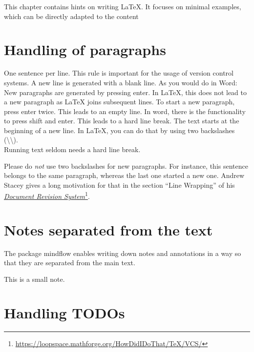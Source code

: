 This chapter contains hints on writing LaTeX.
It focuses on minimal examples, which can be directly adapted to the content

\section{Handling of paragraphs}

\begin{ltgexample}
One sentence per line.
This rule is important for the usage of version control systems.
A new line is generated with a blank line.
As you would do in Word:
New paragraphs are generated by pressing enter.
In LaTeX, this does not lead to a new paragraph as LaTeX joins subsequent lines.
To start a new paragraph, press enter twice.
This leads to an empty line.
In word, there is the functionality to press shift and enter.
This leads to a hard line break.
The text starts at the beginning of a new line.
In LaTeX, you can do that by using two backslashes (\textbackslash\textbackslash).
\\
Running text seldom needs a hard line break.

Please do \textit{not} use two backslashes for new paragraphs.
For instance, this sentence belongs to the same paragraph, whereas the last one started a new one.
Andrew Stacey gives a long motivation for that in the section \enquote{Line Wrapping} of his \href{https://loopspace.mathforge.org/HowDidIDoThat/TeX/VCS/#section.3}{\emph{Document Revision System}}\footnote{\url{https://loopspace.mathforge.org/HowDidIDoThat/TeX/VCS/}}.
\end{ltgexample}

\section{Notes separated from the text}

The package mindflow enables writing down notes and annotations in a way so that they are separated from the main text.

\begin{ltgexample}
\begin{mindflow}
This is a small note.
\end{mindflow}
\end{ltgexample}

\section{Handling TODOs}

